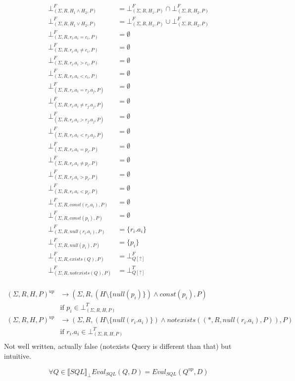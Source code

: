 \begin{mydef}
	\begin{align*}
		\bot^F_{(\Sigma,R,H_1 \land H_2,P)} & = \bot^F_{(\Sigma,R,H_1,P)} \cap \bot^F_{(\Sigma,R,H_2,P)} \\
		\bot^F_{(\Sigma,R,H_1 \lor H_2,P)} & = \bot^F_{(\Sigma,R,H_1,P)} \cup \bot^F_{(\Sigma,R,H_2,P)} \\
		\bot^F_{(\Sigma,R,r_i.a_i = c_i,P)} & =\emptyset \\
		\bot^F_{(\Sigma,R,r_i.a_i \neq c_i,P)} & = \emptyset \\
		\bot^F_{(\Sigma,R,r_i.a_i > c_i,P)} & =\emptyset \\
		\bot^F_{(\Sigma,R,r_i.a_i < c_i,P)} & =\emptyset \\
		\bot^F_{(\Sigma,R,r_i.a_i = r_j.a_j,P)} & = \emptyset \\
		\bot^F_{(\Sigma,R,r_i.a_i \neq r_j.a_j,P)} & = \emptyset \\
		\bot^F_{(\Sigma,R,r_i.a_i > r_j.a_j,P)} & = \emptyset \\
		\bot^F_{(\Sigma,R,r_i.a_i < r_j.a_j,P)} & = \emptyset \\
		\bot^F_{(\Sigma,R,r_i.a_i = p_i,P)} & = \emptyset\\
		\bot^F_{(\Sigma,R,r_i.a_i \neq p_i,P)} & = \emptyset \\
		\bot^F_{(\Sigma,R,r_i.a_i > p_i,P)} & = \emptyset\\
		\bot^F_{(\Sigma,R,r_i.a_i < p_i,P)} & = \emptyset\\
		\bot^F_{(\Sigma,R,const(r_i.a_i),P)} & = \emptyset \\
		\bot^F_{(\Sigma,R,const(p_i),P)} & = \emptyset \\
		\bot^F_{(\Sigma,R,null(r_i.a_i),P)} & = \{r_i.a_i\} \\
		\bot^F_{(\Sigma,R,null(p_i),P)} & = \{p_i\} \\
		\bot^F_{(\Sigma,R,exists(Q),P)} & = \bot^F_{Q[?]} \\
		\bot^F_{(\Sigma,R,notexists(Q),P)} & = \bot^T_{Q[?]}\\
	\end{align*}
\end{mydef}

\begin{mydef}
	\begin{align*}
		(\Sigma,R,H,P)^{up} & \rightarrow (\Sigma,R,(H\setminus \{null(p_i)\}) \land const(p_i),P) \\
		& \mbox{if } p_i \in \bot^T_{(\Sigma,R,H,P)}  \\
		(\Sigma,R,H,P)^{up} & \rightarrow (\Sigma,R,(H\setminus \{null(r_i.a_i)\}) \land notexists((*,R,null(r_i.a_i),P)),P) \\
		& \mbox{if } r_i.a_i \in \bot^T_{(\Sigma,R,H,P)}  \\
	\end{align*}
Not well written, actually false (notexists Query is different than that) but intuitive. 
\end{mydef}

\begin{myprop}
	$$\forall Q \in \llbracket SQL \rrbracket_\bot Eval_{SQL}(Q,D) = Eval_{SQL}(Q^{up},D)$$
\end{myprop}

